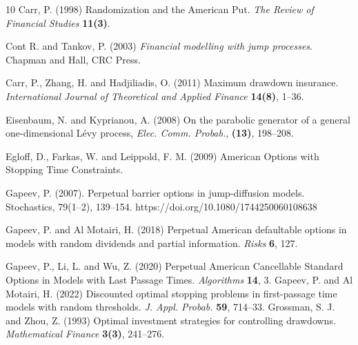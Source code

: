 \documentclass[10pt]{amsart}
\begin{document}
\begin{thebibliography}{10}
			 Carr, P. (1998) Randomization and the American Put. {\it The Review of Financial Studies} {\bf 11(3)}.
			
			Cont R. and Tankov, P. (2003)
			{\it Financial modelling with jump processes}.
			Chapman and Hall, CRC Press.
			
			Carr, P., Zhang, H. and Hadjiliadis, O. (2011) Maximum drawdown insurance. {\it International
				Journal of Theoretical and Applied Finance} {\bf 14(8)}, 1--36.
			
			Eisenbaum, N. and Kyprianou, A. (2008)
			On the parabolic generator of a general one-dimensional L\'evy
			process, {\it Elec. Comm. Probab.}, {\bf (13)}, 198--208.
			
			 Egloff, D., Farkas, W. and Leippold, F. M. (2009) American Options with Stopping Time Constraints.
			
			 Gapeev, P. (2007). Perpetual barrier options in jump-diffusion models. Stochastics, 79(1–2), 139–154. https://doi.org/10.1080/1744250060108638
			
			 Gapeev, P. and Al Motairi, H. (2018) Perpetual American defaultable options in models with random dividends and partial information. {\it Risks} {\bf 6}, 127.
			
			 Gapeev, P., Li, L. and Wu, Z. (2020) Perpetual American Cancellable Standard Options in Models with Last Passage Times. {\it Algorithms} {\bf 14}, 3.
			 Gapeev, P. and Al Motairi, H. (2022) Discounted optimal stopping problems in first-passage time models with random thresholds. {\it J. Appl. Probab.} {\bf 59}, 714--33.
			Grossman, S. J. and Zhou, Z. (1993) Optimal investment strategies for controlling drawdowns.
			{\it Mathematical Finance} {\bf 3(3)}, 241--276.
			

\end{thebibliography}
\end{document}

